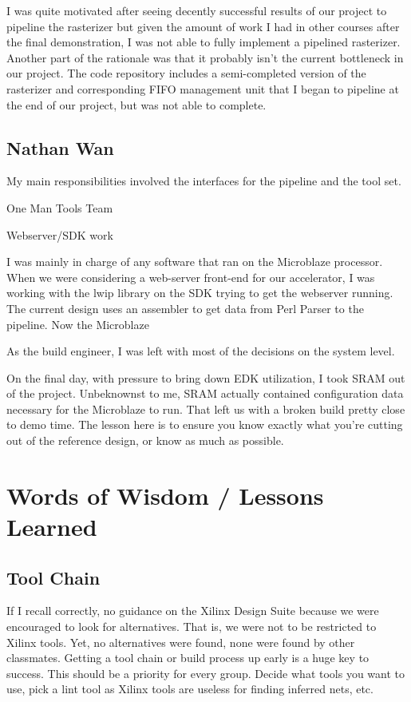 \documentclass[letterpaper,10pt]{article}
\begin{document}
I was quite motivated after seeing decently successful results of our project to pipeline the rasterizer but given the amount of work I had in other courses after the final demonstration, I was not able to fully implement a pipelined rasterizer. Another part of the rationale was that it probably isn't the current bottleneck in our project. The code repository includes a semi-completed version of the rasterizer and corresponding FIFO management unit that I began to pipeline at the end of our project, but was not able to complete.

\subsection{Nathan Wan}

My main responsibilities involved the interfaces for the pipeline and the tool set.

One Man Tools Team

Webserver/SDK work

I was mainly in charge of any software that ran on the Microblaze processor.  When we were considering a web-server front-end for our accelerator, I was working with the lwip library on the SDK trying to get the webserver running.  The current design uses an assembler to get data from Perl Parser to the pipeline.  Now the Microblaze 

As the build engineer, I was left with most of the decisions on the system level.   

On the final day, with pressure to bring down EDK utilization, I took SRAM out of the project.  Unbeknownst to me, SRAM actually contained configuration data necessary for the Microblaze to run.  That left us with a broken build pretty close to demo time.   The lesson here is to ensure you know exactly what you're cutting out of the reference design, or know as much as possible.

\section{Words of Wisdom / Lessons Learned}

\subsection{Tool Chain}
If I recall correctly, no guidance on the Xilinx Design Suite because we were encouraged to look for alternatives.  That is, we were not to be restricted to Xilinx tools.  Yet, no alternatives were found, none were found by other classmates.  Getting a tool chain or build process up early is a huge key to success.  This should be a priority for every group. Decide what tools you want to use, pick a lint tool as Xilinx tools are useless for finding inferred nets, etc.
\end{document}

